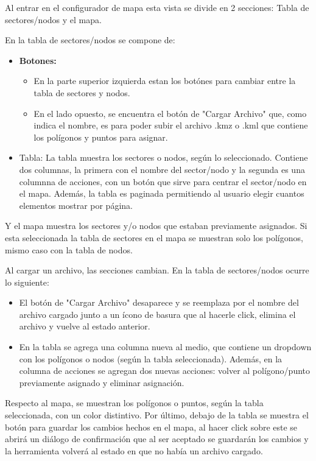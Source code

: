 Al entrar en el configurador de mapa esta vista se divide en 2 secciones: Tabla de sectores/nodos y el mapa.

En la tabla de sectores/nodos se compone de:

\begin{itemize}
    \item \textbf{Botones:}
          \begin{itemize}
              \item En la parte superior izquierda estan los botónes para cambiar entre la tabla de sectores y nodos.
              \item En el lado opuesto, se encuentra el botón de "Cargar Archivo" que, como indica el nombre, es para poder subir el archivo .kmz o .kml que contiene los polígonos y puntos para asignar.
          \end{itemize}
    \item Tabla: La tabla muestra los sectores o nodos, según lo seleccionado. Contiene dos columnas, la primera con el nombre del sector/nodo y la segunda es una columnna de acciones, con un botón que sirve para centrar el sector/nodo en el mapa. Además, la tabla es paginada permitiendo al usuario elegir cuantos elementos mostrar por página.
\end{itemize}

Y el mapa muestra los sectores y/o nodos que estaban previamente asignados. Si esta seleccionada la tabla de sectores en el mapa se muestran solo los polígonos, mismo caso con la tabla de nodos.

Al cargar un archivo, las secciones cambian. En la tabla de sectores/nodos ocurre lo siguiente:

\begin{itemize}
    \item El botón de "Cargar Archivo" desaparece y se reemplaza por el nombre del archivo cargado junto a un ícono de basura que al hacerle click, elimina el archivo y vuelve al estado anterior.
    \item En la tabla se agrega una columna nueva al medio, que contiene un dropdown con los polígonos o nodos (según la tabla seleccionada). Además, en la columna de acciones se agregan dos nuevas acciones: volver al polígono/punto previamente asignado y eliminar asignación.
\end{itemize}

Respecto al mapa, se muestran los polígonos o puntos, según la tabla seleccionada, con un color distintivo. Por último, debajo de la tabla se muestra el botón para guardar los cambios hechos en el mapa, al hacer click sobre este se abrirá un diálogo de confirmación que al ser aceptado se guardarán los cambios y la herramienta volverá al estado en que no había un archivo cargado.
\iffalse
